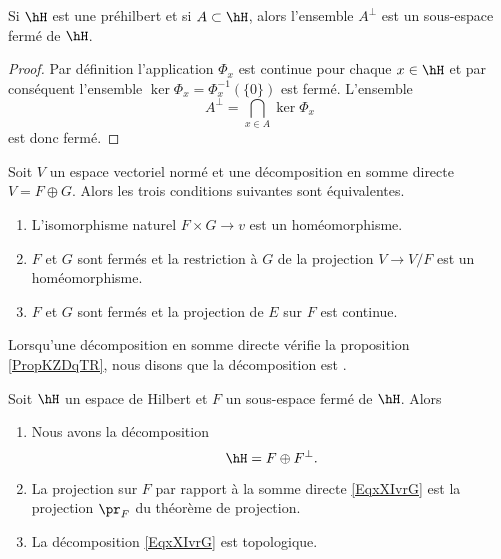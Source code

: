 \begin{proposition}     \label{PropdpaMpH}
    Si \( \hH\) est une préhilbert et si \( A\subset \hH\), alors l'ensemble \( A^{\perp}\) est un sous-espace fermé de \( \hH\).
\end{proposition}

\begin{proof}
    Par définition l'application \( \Phi_x\) est continue pour chaque \( x\in\hH\) et par conséquent l'ensemble \( \ker\Phi_x=\Phi_x^{-1}(\{ 0 \})\) est fermé. L'ensemble
    \begin{equation}
        A^{\perp}=\bigcap_{x\in A}\ker\Phi_x
    \end{equation}
    est donc fermé.    
\end{proof}

\begin{proposition}     \label{PropKZDqTR}
    Soit \( V\) un espace vectoriel normé et une décomposition en somme directe \( V=F\oplus G\). Alors les trois conditions suivantes sont équivalentes.
    \begin{enumerate}
        \item
            L'isomorphisme naturel \( F\times G\to v\) est un homéomorphisme.
        \item
            \( F\) et \( G\) sont fermés et la restriction à \( G\) de la projection \( V\to V/F\) est un homéomorphisme.
        \item
            \( F\) et \( G\) sont fermés et la projection de \( E\) sur \( F\) est continue.
    \end{enumerate}
\end{proposition}
Lorsqu'une décomposition en somme directe vérifie la proposition \ref{PropKZDqTR}, nous disons que la décomposition est .

\begin{theorem}     \label{ThowZyaiz}
    Soit \( \hH\) un espace de Hilbert et \( F\) un sous-espace fermé de \( \hH\). Alors
    \begin{enumerate}
        \item
            Nous avons la décomposition
            \begin{equation}        \label{EqxXIvrG}
                \hH=F\oplus F^{\perp}.
            \end{equation}
        \item       \label{ItemThowZyaizii}
            La projection sur \( F\) par rapport à la somme directe \eqref{EqxXIvrG} est la projection \( \pr_F\) du théorème de projection.
        \item
            La décomposition \eqref{EqxXIvrG} est topologique.
    \end{enumerate}
\end{theorem}

